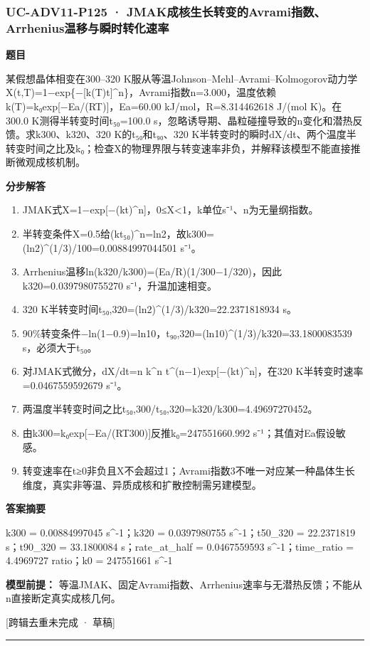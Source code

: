 \documentclass[UTF8,11pt,a4paper]{ctexart}
\begin{document}
\subsubsection*{UC-ADV11-P125 · JMAK成核生长转变的Avrami指数、Arrhenius温移与瞬时转化速率}
\noindent\textbf{题目}\par
某假想晶体相变在300–320 K服从等温Johnson–Mehl–Avrami–Kolmogorov动力学X(t,T)=1−exp\{−[k(T)t]\textasciicircum{}n\}，Avrami指数n=3.000，温度依赖k(T)=k₀exp[−Ea/(RT)]，Ea=60.00 kJ/mol，R=8.314462618 J/(mol K)。在300.0 K测得半转变时间t₅₀=100.0 s，忽略诱导期、晶粒碰撞导致的n变化和潜热反馈。求k300、k320、320 K的t₅₀和t₉₀、320 K半转变时的瞬时dX/dt、两个温度半转变时间之比及k₀；检查X的物理界限与转变速率非负，并解释该模型不能直接推断微观成核机制。\par
\medskip\noindent\textbf{分步解答}
\begin{enumerate}
\item JMAK式X=1−exp[−(kt)\textasciicircum{}n]，0≤X<1，k单位s⁻¹、n为无量纲指数。
\item 半转变条件X=0.5给(kt₅₀)\textasciicircum{}n=ln2，故k300=(ln2)\textasciicircum{}(1/3)/100=0.00884997044501 s⁻¹。
\item Arrhenius温移ln(k320/k300)=(Ea/R)(1/300−1/320)，因此k320=0.0397980755270 s⁻¹，升温加速相变。
\item 320 K半转变时间t₅₀,320=(ln2)\textasciicircum{}(1/3)/k320=22.2371818934 s。
\item 90\%转变条件−ln(1−0.9)=ln10，t₉₀,320=(ln10)\textasciicircum{}(1/3)/k320=33.1800083539 s，必须大于t₅₀。
\item 对JMAK式微分，dX/dt=n k\textasciicircum{}n t\textasciicircum{}(n−1)exp[−(kt)\textasciicircum{}n]，在320 K半转变时速率=0.0467559592679 s⁻¹。
\item 两温度半转变时间之比t₅₀,300/t₅₀,320=k320/k300=4.49697270452。
\item 由k300=k₀exp[−Ea/(RT300)]反推k₀=247551660.992 s⁻¹；其值对Ea假设敏感。
\item 转变速率在t≥0非负且X不会超过1；Avrami指数3不唯一对应某一种晶体生长维度，真实非等温、异质成核和扩散控制需另建模型。
\end{enumerate}
\noindent\textbf{答案摘要}\par
k300 = 0.00884997045 s\textasciicircum{}-1；k320 = 0.0397980755 s\textasciicircum{}-1；t50\_320 = 22.2371819 s；t90\_320 = 33.1800084 s；rate\_at\_half = 0.0467559593 s\textasciicircum{}-1；time\_ratio = 4.4969727 ratio；k0 = 247551661 s\textasciicircum{}-1\par
\noindent\textbf{模型前提：}
等温JMAK、固定Avrami指数、Arrhenius速率与无潜热反馈；不能从n直接断定真实成核几何。\par
\noindent\textcolor{red!65!black}{[跨辑去重未完成 · 草稿]} \par
\medskip\hrule\medskip
{}
\end{document}
